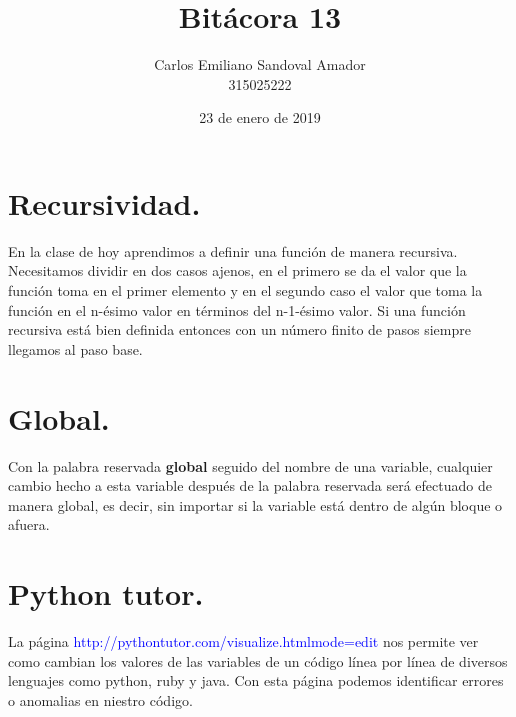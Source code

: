 \documentclass[letterpaper, 12pt, oneside]{article}%
\title{Bitácora 13}
\author{Carlos Emiliano Sandoval Amador \\ 315025222}
\date{23 de enero de 2019}
\begin{document}
	\maketitle
	\section*{Recursividad.}
	En la clase de hoy aprendimos a definir una función de manera recursiva. Necesitamos dividir en dos casos ajenos, en el primero se da el valor que la función toma en el primer elemento y en el segundo caso el valor que toma la función en el n-ésimo valor en términos del n-1-ésimo valor. Si una función recursiva está bien definida entonces con un número finito de pasos siempre llegamos al paso base.
	\section*{Global.}
	Con la palabra reservada \textbf{global} seguido del nombre de una variable, cualquier cambio hecho a esta variable después de la palabra reservada será efectuado de manera global, es decir, sin importar si la variable está dentro de algún bloque o afuera.
	\section*{Python tutor.}
	La página \textcolor{blue}{http://pythontutor.com/visualize.htmlmode=edit} nos permite ver como cambian los valores de las variables de un código línea por línea de diversos lenguajes como python, ruby y java. Con esta página podemos identificar errores o anomalias en niestro código.
\end{document}
